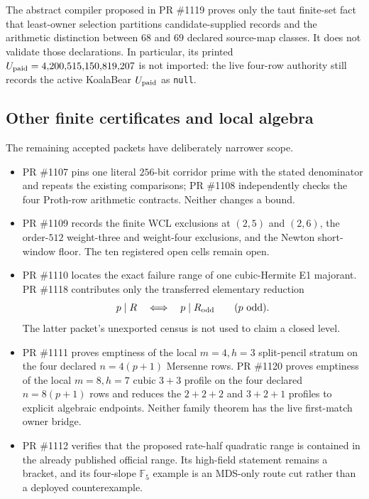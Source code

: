 \documentclass[11pt]{article}
\begin{document}
The abstract compiler proposed in PR \#1119 proves only the taut finite-set
fact that least-owner selection partitions candidate-supplied records and the
arithmetic distinction between \(68\) and \(69\) declared source-map classes.
It does not validate those declarations.  In particular, its printed
\(U_{\rm paid}=4{,}200{,}515{,}150{,}819{,}207\) is not imported: the live
four-row authority still records the active KoalaBear \(U_{\rm paid}\) as
\texttt{null}.

\subsection{Other finite certificates and local algebra}

The remaining accepted packets have deliberately narrower scope.
\begin{itemize}
\item PR \#1107 pins one literal \(256\)-bit corridor prime with the stated
  denominator and repeats the existing comparisons; PR \#1108 independently
  checks the four Proth-row arithmetic contracts.  Neither changes a bound.
\item PR \#1109 records the finite WCL exclusions at \((2,5)\) and \((2,6)\),
  the order-\(512\) weight-three and weight-four exclusions, and the Newton
  short-window floor.  The ten registered open cells remain open.
\item PR \#1110 locates the exact failure range of one cubic-Hermite E1
  majorant.  PR \#1118 contributes only the transferred elementary reduction
  \[
    p\mid R\quad\Longleftrightarrow\quad p\mid R_{\rm odd}
    \qquad(p\ \hbox{odd}).
  \]
  The latter packet's unexported census is not used to claim a closed level.
\item PR \#1111 proves emptiness of the local \(m=4,h=3\) split-pencil stratum
  on the four declared \(n=4(p+1)\) Mersenne rows.  PR \#1120 proves emptiness
  of the local \(m=8,h=7\) cubic \(3+3\) profile on the four declared
  \(n=8(p+1)\) rows and reduces the \(2+2+2\) and \(3+2+1\) profiles to
  explicit algebraic endpoints.  Neither family theorem has the live
  first-match owner bridge.
\item PR \#1112 verifies that the proposed rate-half quadratic range is
  contained in the already published official range.  Its high-field
  statement remains a bracket, and its four-slope \(\mathbb F_5\) example is
  an MDS-only route cut rather than a deployed counterexample.
\end{itemize}
\end{document}
